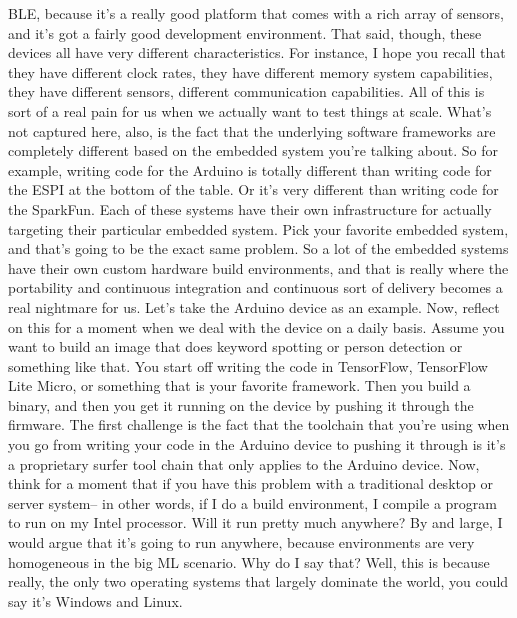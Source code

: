 {{{    BLE, because it's a really good platform that
    comes with a rich array of sensors, and it's got a fairly good development
    environment.
    That said, though, these devices all have very different characteristics.
    For instance, I hope you recall that they have different clock rates,
    they have different memory system capabilities,
    they have different sensors, different communication capabilities.
    All of this is sort of a real pain for us
    when we actually want to test things at scale.
    What's not captured here, also, is the fact
    that the underlying software frameworks are completely different
    based on the embedded system you're talking about.
    So for example, writing code for the Arduino
    is totally different than writing code for the ESPI
    at the bottom of the table.
    Or it's very different than writing code for the SparkFun.
    Each of these systems have their own infrastructure
    for actually targeting their particular embedded system.
    Pick your favorite embedded system, and that's
    going to be the exact same problem.
    So a lot of the embedded systems have their own custom hardware
    build environments, and that is really where
    the portability and continuous integration and continuous sort
    of delivery becomes a real nightmare for us.
    Let's take the Arduino device as an example.
    Now, reflect on this for a moment when we
    deal with the device on a daily basis.
    Assume you want to build an image that does keyword spotting or person
    detection or something like that.
    You start off writing the code in TensorFlow,
    TensorFlow Lite Micro, or something that is your favorite framework.
    Then you build a binary, and then you get it running on the device
    by pushing it through the firmware.
    The first challenge is the fact that the toolchain
    that you're using when you go from writing your code in the Arduino device
    to pushing it through is it's a proprietary surfer tool chain that
    only applies to the Arduino device.
    Now, think for a moment that if you have this problem with a traditional desktop
    or server system-- in other words, if I do a build environment,
    I compile a program to run on my Intel processor.
    Will it run pretty much anywhere?
    By and large, I would argue that it's going
    to run anywhere, because environments are very homogeneous in the big ML
    scenario.
    Why do I say that?
    Well, this is because really, the only two operating
    systems that largely dominate the world, you could say it's Windows and Linux.
}}}
